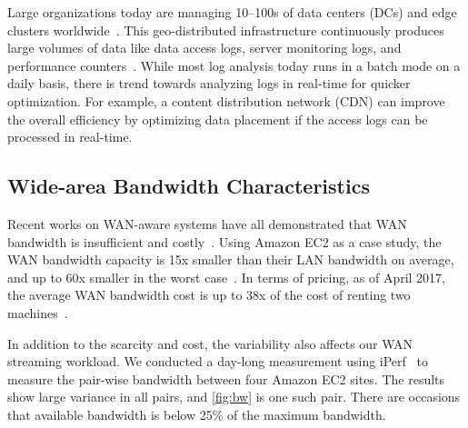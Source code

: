 
 Large organizations today are managing
10--100s of data centers (DCs) and edge clusters
worldwide~\cite{calder2013mapping}. This geo-distributed infrastructure
continuously produces large volumes of data like data access logs, server
monitoring logs, and performance counters~\cite{pu2015low,
  rabkin2014aggregation}. While most log analysis today runs in a batch mode on
a daily basis, there is trend towards analyzing logs in real-time for quicker
optimization. For example, a content distribution network (CDN) can improve the
overall efficiency by optimizing data placement if the access logs can be
processed in real-time.


\subsection{Wide-area Bandwidth Characteristics}
\label{sec:wide-area-bandwidth}

Recent works on WAN-aware systems have all demonstrated that WAN bandwidth is
insufficient and costly~\cite{pu2015low, vulimiri2015global,
  vulimiri2015wananlytics, hsieh17gaia}. Using Amazon EC2 as a case study, the
WAN bandwidth capacity is 15x smaller than their LAN bandwidth on average, and
up to 60x smaller in the worst case~\cite{hsieh17gaia}. In terms of pricing, as
of April 2017, the average WAN bandwidth cost is up to 38x of the cost of
renting two machines~\cite{amazon2017pricing}.

In addition to the scarcity and cost, the variability also affects our WAN
streaming workload. We conducted a day-long measurement using
iPerf~\cite{iperf3} to measure the pair-wise bandwidth between four Amazon EC2
sites. The results show large variance in all pairs, and \autoref{fig:bw} is one
such pair. There are occasions that available bandwidth is below 25\% of the
maximum bandwidth.


